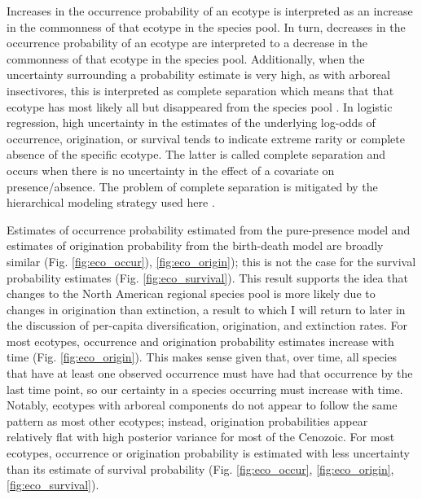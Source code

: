 \documentclass[12pt,letterpaper]{article}
\begin{document}
Increases in the occurrence probability of an ecotype is interpreted as an increase in the commonness of that ecotype in the species pool. In turn, decreases in the occurrence probability of an ecotype are interpreted to a decrease in the commonness of that ecotype in the species pool. Additionally, when the uncertainty surrounding a probability estimate is very high, as with arboreal insectivores, this is interpreted as complete separation which means that that ecotype has most likely all but disappeared from the species pool \citep{Gelman2007}. In logistic regression, high uncertainty in the estimates of the underlying log-odds of occurrence, origination, or survival tends to indicate extreme rarity or complete absence of the specific ecotype. The latter is called complete separation and occurs when there is no uncertainty in the effect of a covariate on presence/absence. The problem of complete separation is mitigated by the hierarchical modeling strategy used here \citep{Gelman2013d,Gelman2007,McElreath2016}.

Estimates of occurrence probability estimated from the pure-presence model and estimates of origination probability from the birth-death model are broadly similar (Fig. \ref{fig:eco_occur}), \ref{fig:eco_origin}); this is not the case for the survival probability estimates (Fig. \ref{fig:eco_survival}). This result supports the idea that changes to the North American regional species pool is more likely due to changes in origination than extinction, a result to which I will return to later in the discussion of per-capita diversification, origination, and extinction rates. For most ecotypes, occurrence and origination probability estimates increase with time (Fig. \ref{fig:eco_origin}). This makes sense given that, over time, all species that have at least one observed occurrence must have had that occurrence by the last time point, so our certainty in a species occurring must increase with time. Notably, ecotypes with arboreal components do not appear to follow the same pattern as most other ecotypes; instead, origination probabilities appear relatively flat with high posterior variance for most of the Cenozoic. For most ecotypes, occurrence or origination probability is estimated with less uncertainty than its estimate of survival probability (Fig. \ref{fig:eco_occur}, \ref{fig:eco_origin}, \ref{fig:eco_survival}). 
\end{document}
